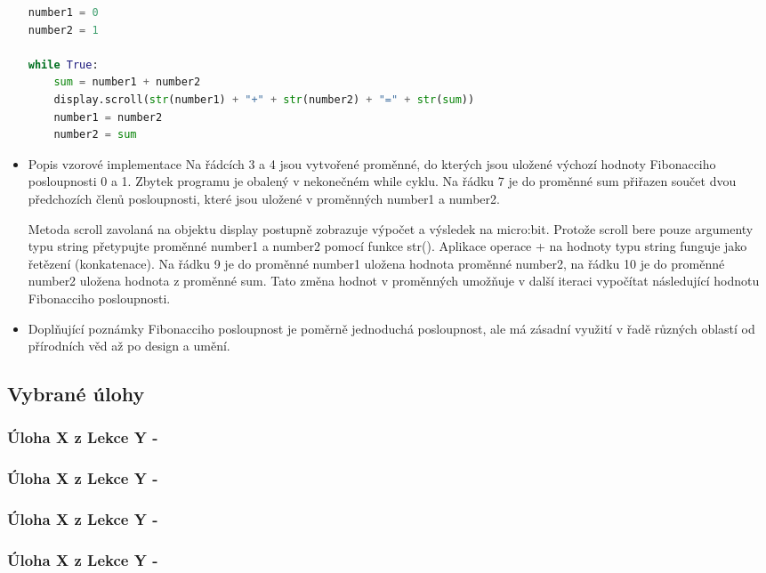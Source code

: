 \documentclass[
  digital,     %
  oneside,     %
  nosansbold,  %
  colorbold, %
  lof,         %
  nolot,         %
]{fithesis4}
\begin{document}
\begin{itemize}
\begin{lstlisting}[language=Python, caption=Úloha 1 - Hello World]
number1 = 0
number2 = 1   

while True:   
    sum = number1 + number2     
    display.scroll(str(number1) + "+" + str(number2) + "=" + str(sum))
    number1 = number2
    number2 = sum
\end{lstlisting}
    \item Popis vzorové implementace
Na řádcích 3 a 4 jsou vytvořené proměnné, do kterých jsou uložené výchozí hodnoty Fibonacciho posloupnosti 0 a 1. Zbytek programu je obalený v nekonečném while cyklu. Na řádku 7 je do proměnné sum přiřazen součet dvou předchozích členů posloupnosti, které jsou uložené v proměnných number1 a number2.

Metoda scroll zavolaná na objektu display postupně zobrazuje výpočet a výsledek na micro:bit. Protože scroll bere pouze argumenty typu string přetypujte proměnné number1 a number2 pomocí funkce str(). Aplikace operace + na hodnoty typu string funguje jako řetězení (konkatenace). Na řádku 9 je do proměnné number1 uložena hodnota proměnné number2, na řádku 10 je do proměnné number2 uložena hodnota z proměnné sum. Tato změna hodnot v proměnných umožňuje v další iteraci vypočítat následující hodnotu Fibonacciho posloupnosti.
    \item Doplňující poznámky
Fibonacciho posloupnost je poměrně jednoduchá posloupnost, ale má zásadní využití v řadě různých oblastí od přírodních věd až po design a umění.

\end{itemize}

\subsection{Vybrané úlohy}

\subsubsection{Úloha X z Lekce Y - }

\subsubsection{Úloha X z Lekce Y - }

\subsubsection{Úloha X z Lekce Y - }

\subsubsection{Úloha X z Lekce Y - }
\end{document}

